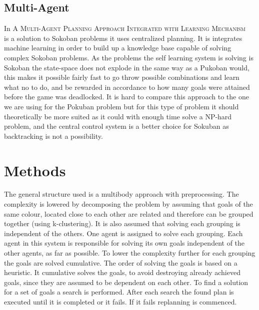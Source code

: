 \documentclass[letterpaper]{article}
\begin{document}
	\subsection{Multi-Agent}
		In \textsc{A Multi-Agent Planning Approach Integrated with Learning Mechanism} ~\cite{Multi-Agent} is a solution to Sokoban problems it uses centralized planning. It is integrates machine learning in order to build up a knowledge base capable of solving complex Sokoban problems. As the problems the self learning system is solving is Sokoban the state-space does not explode in the same way as a Pukoban would, this makes it possible fairly fast to go throw possible combinations and learn what no to do, and be rewarded in accordance to how many goals were attained before the game was deadlocked. It is hard to compare this approach to the one we are using for the Pokuban problem but for this type of problem it should theoretically be more suited as it could with enough time solve a NP-hard problem, and the central control system is a better choice for Sokuban as backtracking is not a possibility.

\section{Methods}
%		
%		
%		
	The general structure used is a multibody approach with preprocessing. The complexity is lowered by decomposing the problem by assuming that goals of the same colour, located close to each other are related and therefore can be grouped together (using k-clustering). It is also assumed that solving each grouping is independent of the others. One agent is assigned to solve each grouping. Each agent in this system is responsible for solving its own goals independent of the other agents, as far as possible. 
	To lower the complexity further for each grouping the goals are solved cumulative. The order of solving the goals is based on a heuristic. It cumulative solves the goals, to avoid destroying already achieved goals, since they are assumed to be dependent on each other. To find a solution for a set of goals a search is performed. After each search the found plan is executed until it is completed or it fails. If it fails replanning is commenced.
\end{document}
